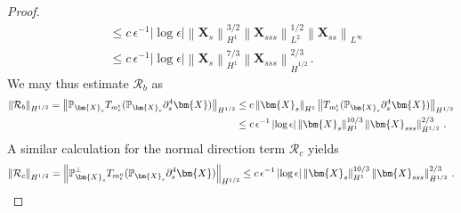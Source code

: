 \documentclass[11pt,reqno]{amsart}
\renewcommand{\P}{\mathbb{P}}
\newcommand{\X}{\bm{X}}
\newcommand{\p}{\partial}
\newcommand{\abs}[1]{\left\lvert #1 \right\rvert}
\newcommand{\norm}[1]{\left\lVert #1 \right\rVert}
\newcommand{\mc}[1]{\mathcal{#1}}
\numberwithin{equation}{section}
\theoremstyle{definition}
\begin{document}
\begin{proof}
\begin{equation}
\begin{aligned}
  &\le c\,\epsilon^{-1}\abs{\log\epsilon}\norm{\X_s}_{H^1}^{3/2}\norm{\X_{sss}}_{L^2}^{1/2}\norm{\X_{ss}}_{L^\infty}\\
  &\le c\,\epsilon^{-1}\abs{\log\epsilon}\norm{\X_s}_{H^1}^{7/3}\norm{\X_{sss}}_{\dot H^{1/2}}^{2/3}\,.
\end{aligned}
\end{equation}
%
We may thus estimate $\mc{R}_b$ as 
\begin{equation}
\begin{aligned}
   \norm{\mc{R}_b}_{H^{1/2}}=\norm{\P_{\X_s}T_{m_\epsilon^{\rm t}}(\P_{\X_s}\p_s^4\X)}_{H^{1/2}}&\le c\norm{\X_s}_{H^1}\norm{T_{m_\epsilon^{\rm t}}(\P_{\X_s}\p_s^4\X)}_{H^{1/2}} \\
   &\le c\,\epsilon^{-1}\abs{\log\epsilon}\norm{\X_s}_{H^1}^{10/3}\norm{\X_{sss}}_{\dot H^{1/2}}^{2/3}\,.
\end{aligned}
\end{equation}
%
A similar calculation for the normal direction term $\mc{R}_c$ yields 
\begin{equation}
  \norm{\mc{R}_c}_{H^{1/2}}=\norm{\P_{\X_s}^\perp T_{m_\epsilon^{\rm n}}(\P_{\X_s}\p_s^4\X)}_{H^{1/2}} \le c\,\epsilon^{-1}\abs{\log\epsilon}\norm{\X_s}_{H^1}^{10/3}\norm{\X_{sss}}_{\dot H^{1/2}}^{2/3}\,.
\end{equation}




\end{proof}
\end{document}
